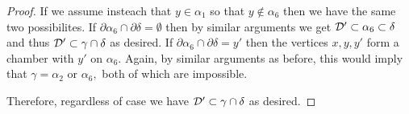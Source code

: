 \documentclass[class=book, crop=false]{standalone}
\begin{document}
\begin{proof}
	If we assume insteach that $y\in\alpha_1$ so that $y\not\in \alpha_6$ then we have the same two possibilites. If $\partial \alpha_6\cap \partial \delta=\emptyset$ then by similar arguments we get $\mathcal{D}'\subset \alpha_6\subset \delta$ and thus $\mathcal{D}'\subset \gamma\cap \delta$ as desired. If $\partial \alpha_6\cap \partial\delta=y'$ then the vertices $x,y,y'$ form a chamber with $y'$ on $\alpha_6.$ Again, by similar arguments as before, this would imply that $\gamma=\alpha_2$ or $\alpha_6,$ both of which are impossible.

	Therefore, regardless of case we have $\mathcal{D}'\subset \gamma\cap \delta$ as desired.
	

\end{proof}
%
%
%
\end{document}
